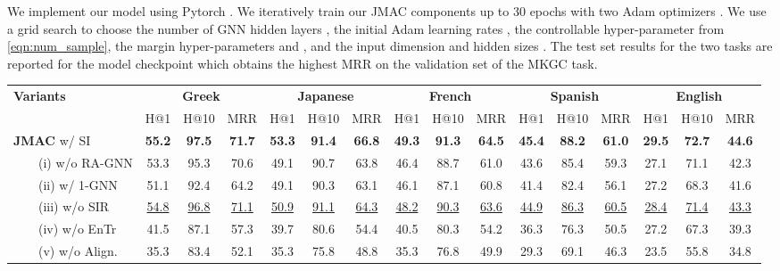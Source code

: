 \documentclass[11pt]{article}
\begin{document}
We implement our model using  Pytorch \cite{NEURIPS2019_9015}.
We iteratively train our JMAC components up to 30 epochs with two Adam optimizers \cite{kingma2014adam}. We use a grid search to choose the number of GNN hidden layers , the initial Adam learning rates , the controllable hyper-parameter  from \autoref{eqn:num_sample}, the margin hyper-parameters  and  , and the input dimension and  hidden sizes .  
The test set results for the two tasks are reported for the model checkpoint which obtains the highest MRR on the validation set of the MKGC task.




\begin{table*}[!t]
    \begin{adjustbox}{width=440pt,center}
    \centering
    \setlength{\tabcolsep}{0.2em}
    \def\arraystretch{1.15}
    \begin{tabular}{l|ccc|ccc|ccc|ccc|ccc}
    \hline
    \multirow{2}{*}{\bf Variants} & 
    \multicolumn{3}{c|}{\bf Greek} &
    \multicolumn{3}{c|}{\bf Japanese} &
    \multicolumn{3}{c|}{\bf French} &
    \multicolumn{3}{c|}{\bf Spanish} &
    \multicolumn{3}{c}{\bf English} \\
    \cline{2-16} 
    & H@1 & H@10 & MRR & H@1 & H@10 & MRR & H@1 & H@10 & MRR & H@1 & H@10 & MRR& H@1 & H@10 & MRR  \\
    \hline
    \textbf{JMAC} w/ SI & \textbf{55.2} & \textbf{97.5} & \textbf{71.7} & \textbf{53.3} & \textbf{91.4} & \textbf{66.8} & \textbf{49.3} & \textbf{91.3} & \textbf{64.5} & \textbf{45.4} & \textbf{88.2} & \textbf{61.0} & \textbf{29.5} & \textbf{72.7} & \textbf{44.6} \\
    \hline
    \ \ \ \ (i) w/o RA-GNN & 53.3 & 95.3 & 70.6 & 49.1 & 90.7 & 63.8 & 46.4 & 88.7 & 61.0 & 43.6 & 85.4 & 59.3 & 27.1 & 71.1 & 42.3  \\
    \ \ \ \ (ii)  w/ 1-GNN & 51.1 & 92.4 & 64.2 & 49.1 & 90.3 & 63.1 & 46.1 & 87.1 & 60.8 & 41.4 & 82.4 & 56.1 & 27.2 & 68.3 & 41.6 \\
\ \ \ \ (iii) w/o SIR & \underline{54.8} & \underline{96.8} & \underline{71.1} & \underline{50.9} & \underline{91.1} & \underline{64.3} & \underline{48.2} & \underline{90.3} & \underline{63.6} & \underline{44.9} & \underline{86.3} & \underline{60.5} & \underline{28.4} & \underline{71.4} & \underline{43.3} \\
    \ \ \ \ (iv) w/o EnTr & 41.5 & 87.1 & 57.3 & 39.7 & 80.6 & 54.4 & 40.5 & 80.3 & 54.2 & 36.3 & 76.3 & 50.5 & 27.2 & 67.3 & 39.3 \\
    \ \ \ \ (v) w/o Align.  & 35.3 & 83.4 & 52.1 & 35.3 & 75.8 & 48.8 & 35.3 & 76.8 & 49.9 & 29.3 & 69.1 & 46.3 & 23.5 & 55.8 & 34.8 \\

\end{tabular}
\end{adjustbox}
\end{table*}
\end{document}

